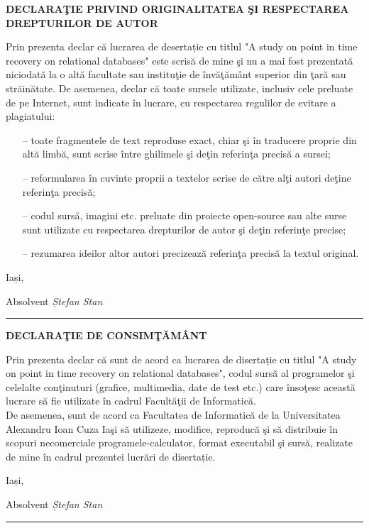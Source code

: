 \thispagestyle{empty}
\large
\textbf{DECLARAŢIE PRIVIND ORIGINALITATEA ŞI RESPECTAREA DREPTURILOR DE AUTOR}
\vspace{2.5cm}
\large
\par
Prin prezenta declar că lucrarea de desertație cu titlul "A study on point in time recovery on relational databases" este scrisă de mine şi nu a mai fost prezentată niciodată la o altă facultate sau instituţie de învăţământ superior din ţară sau străinătate. De asemenea, declar că toate sursele utilizate, inclusiv cele preluate de pe Internet, sunt indicate în lucrare, cu respectarea regulilor de evitare a plagiatului:
\\
\begin{itemize}
\item[--] toate fragmentele de text reproduse exact, chiar şi în traducere proprie din altă limbă, sunt scrise între ghilimele şi deţin referinţa precisă a sursei;
\item[--] reformularea în cuvinte proprii a textelor scrise de către alţi autori deţine referinţa precisă;
\item[--] codul sursă, imagini etc. preluate din proiecte open-source sau alte surse sunt utilizate cu respectarea drepturilor de autor şi deţin referinţe precise;
\item[--] rezumarea ideilor altor autori precizează referinţa precisă la textul original.
\end{itemize}
\vspace{5cm}
Iași,
\vspace{1cm}
\begin{flushright}
Absolvent \textit{Ștefan Stan}
\\
\vspace{0.6cm}
\rule{4.1cm}{0.4pt}

\end{flushright}

\newpage
\thispagestyle{empty}
\large
\begin{center}
\textbf{DECLARAŢIE DE CONSIMŢĂMÂNT}
\end{center}
\vspace{2.5cm}
\large
Prin prezenta declar că sunt de acord ca lucrarea de disertație cu titlul "A study on point in time recovery on relational databases", codul sursă al programelor şi celelalte conţinuturi (grafice, multimedia, date de test etc.) care însoţesc această lucrare să fie utilizate în cadrul Facultăţii de Informatică.
\\
De asemenea, sunt de acord ca Facultatea de Informatică de la Universitatea Alexandru Ioan Cuza Iaşi să utilizeze, modifice, reproducă şi să distribuie în scopuri necomerciale programele-calculator, format executabil şi sursă, realizate de mine în cadrul prezentei lucrări de disertație.
\\

\vspace{3.5cm}
\begin{flushleft}
Iași,
\end{flushleft}
\vspace{1cm}
\begin{flushright}
Absolvent \textit{Ștefan Stan}
\\
\vspace{0.6cm}
\rule{4.1cm}{0.4pt}

\end{flushright}
